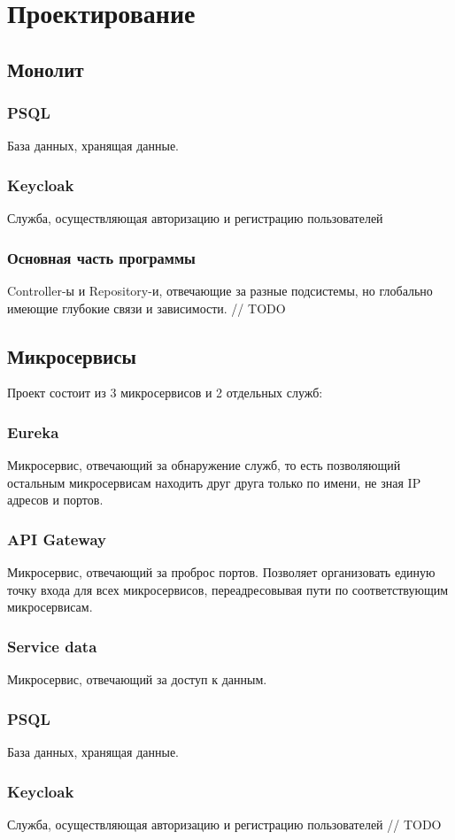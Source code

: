 \section{Проектирование}

\subsection{Монолит}
    \subsubsection{PSQL}
        База данных, хранящая данные.

    \subsubsection{Keycloak}
        Служба, осуществляющая авторизацию и регистрацию пользователей

    \subsubsection{Основная часть программы}
        Controller-ы и Repository-и, отвечающие за разные подсистемы, но глобально имеющие глубокие связи и зависимости.
    // TODO

\subsection{Микросервисы}
    Проект состоит из 3 микросервисов и 2 отдельных служб:

    \subsubsection{Eureka}
        Микросервис, отвечающий за обнаружение служб, то есть позволяющий остальным микросервисам находить друг друга только по имени, не зная IP адресов и портов.

    \subsubsection{API Gateway}
        Микросервис, отвечающий за проброс портов. Позволяет организовать единую точку входа для всех микросервисов, переадресовывая пути по соответствующим микросервисам.

    \subsubsection{Service data}
        Микросервис, отвечающий за доступ к данным.

    \subsubsection{PSQL}
        База данных, хранящая данные.

    \subsubsection{Keycloak}
        Служба, осуществляющая авторизацию и регистрацию пользователей
    // TODO
        
\clearpage